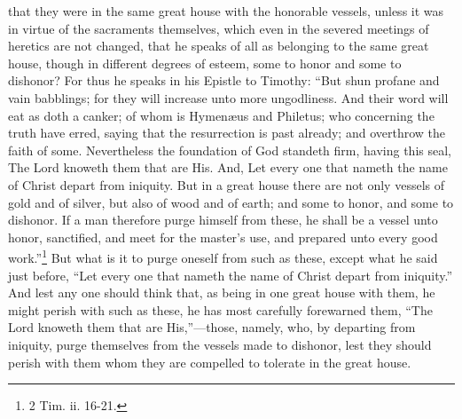 that they were in the same great house with the honorable vessels, unless it was in virtue of the sacraments themselves, which even in the severed meetings of heretics are not changed, that he speaks of all as belonging to the same great house, though in different degrees of esteem, some to honor and some to dishonor? For thus he speaks in his Epistle to Timothy: ``But shun profane and vain babblings; for they will increase unto more ungodliness. And their word will eat as doth a canker; of whom is Hymenæus and Philetus; who concerning the truth have erred, saying that the resurrection is past already; and overthrow the faith of some. Nevertheless the foundation of God standeth firm, having this seal, The Lord knoweth them that are His. And, Let every one that nameth the name of Christ depart from iniquity. But in a great house there are not only vessels of gold and of silver, but also of wood and of earth; and some to honor, and some to dishonor. If a man therefore purge himself from these, he shall be a vessel unto honor, sanctified, and meet for the master’s use, and prepared unto every good work.''\footnote{\par  2 Tim. ii. 16-21.} But what is it to purge oneself from such as these, except what he said just before, ``Let every one that nameth the name of Christ depart from iniquity.'' And lest any one should think that, as being in one great house with them, he might perish with such as these, he has most carefully forewarned them, ``The Lord knoweth them that are His,''—those, namely, who, by departing from iniquity, purge themselves from the vessels made to dishonor, lest they should perish with them whom they are compelled to tolerate in the great house.

